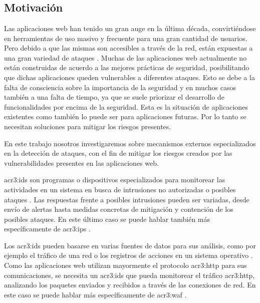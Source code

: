 \renewcommand{\thesection}{\arabic{section}}
\chapter{}
\label{chap:p_contenido}


\section{Motivación}

Las aplicaciones web han tenido un gran auge en la última década,
convirtiéndose en herramientas de uso masivo y frecuente para una
gran cantidad de usuarios. Pero debido a que las mismas son accesibles
a través de la red, están expuestas a una gran variedad de ataques
\cite{gimenez2015tfg}.
Muchas de las aplicaciones web actualmente no están construidas de acuerdo
a las mejores prácticas de seguridad, posibilitando que  dichas aplicaciones
queden vulnerables a diferentes ataques.
Esto se debe a la falta de consciencia sobre la importancia de la
seguridad y en muchos casos también a una falta de tiempo, ya que se
suele priorizar el desarrollo de funcionalidades por encima de la seguridad.
Esta es la situación de aplicaciones existentes como también lo
puede ser para aplicaciones futuras. Por lo tanto se necesitan soluciones
para mitigar los riesgos presentes.

En este trabajo nosotros investigaremos sobre mecanismos externos
especializados en la detección de ataques, con el fin de mitigar los
riesgos creados por las vulnerabilidades presentes en las aplicaciones web.
\bigskip

\gls{acr3:ids} son programas o dispositivos especializados para
monitorear las actividades en un sistema en busca de intrusiones no
autorizadas o posibles ataques \cite{scarfone2007guide}.
Las respuestas frente a posibles intrusiones pueden ser variadas, desde
envío de alertas hasta medidas concretas de mitigación y contención de
los posibles ataques. En este último caso se puede hablar también más
específicamente de \gls{acr3:ips} \cite{scarfone2007guide}.

Los \gls{acr3:ids} pueden basarse en varias fuentes de datos para sus
análisis, como por ejemplo el tráfico de una red o los registros de
acciones en un sistema operativo \cite{torranoGimenez2015study}.
Como las aplicaciones web utilizan mayormente el protocolo \gls{acr3:http}
\cite{fielding1999http} para sus comunicaciones, se necesita un
\gls{acr3:ids} que pueda monitorear el tráfico \gls{acr3:http},
analizando los paquetes enviados y recibidos a través de las conexiones
de red. En este caso se puede hablar más específicamente de \gls{acr3:waf}
\cite{torranoGimenez2015study}.

